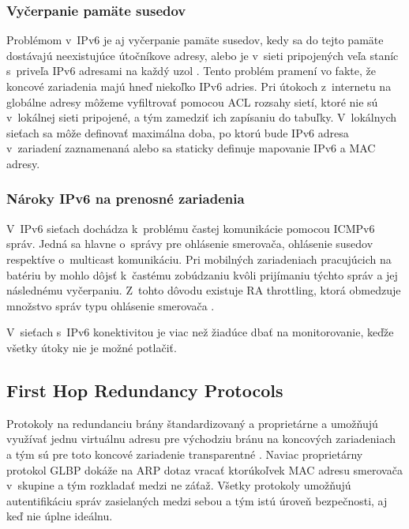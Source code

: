 \subsubsection{Vyčerpanie pamäte susedov}
Problémom v~IPv6 je aj vyčerpanie pamäte susedov, kedy sa do tejto pamäte dostávajú neexistujúce útočníkove adresy, alebo je v~sieti pripojených veľa staníc s~priveľa IPv6 adresami na každý uzol \cite{Podermanski1232015} \cite{Podermanski1932015}. Tento problém pramení vo fakte, že koncové zariadenia majú hneď niekoľko IPv6 adries. Pri útokoch z~internetu na globálne adresy môžeme vyfiltrovať pomocou ACL rozsahy sietí, ktoré nie sú v~lokálnej sieti pripojené, a tým zamedziť ich zapísaniu do tabuľky. V~lokálnych sieťach sa môže definovať maximálna doba, po ktorú bude IPv6 adresa v~zariadení zaznamenaná alebo sa staticky definuje mapovanie IPv6 a MAC adresy. 

\subsubsection{Nároky IPv6 na prenosné zariadenia}
V~IPv6 sieťach dochádza k~problému častej komunikácie pomocou ICMPv6 správ. Jedná sa hlavne o~správy pre ohlásenie smerovača, ohlásenie susedov respektíve o~multicast komunikáciu. Pri mobilných zariadeniach pracujúcich na batériu by mohlo dôjsť k~častému zobúdzaniu kvôli prijímaniu týchto správ a jej následnému vyčerpaniu. Z~tohto dôvodu existuje RA throttling, ktorá obmedzuje množstvo správ typu ohlásenie smerovača \cite{Podermanski532015}.


V~sieťach s~IPv6 konektivitou je viac než žiadúce dbať na monitorovanie, keďže všetky útoky nie je možné potlačiť. 



\subsection{First Hop Redundancy Protocols}
Protokoly na redundanciu brány štandardizovaný  a proprietárne  a  umožňujú využívať jednu virtuálnu adresu pre východziu bránu na koncových zariadeniach a tým sú pre toto koncové zariadenie transparentné \cite{Lammle2013}. Naviac proprietárny protokol GLBP dokáže na ARP dotaz vracať ktorúkoľvek MAC adresu smerovača v~skupine a tým rozkladať medzi ne záťaž. Všetky protokoly umožňujú autentifikáciu správ zasielaných medzi sebou a tým istú úroveň bezpečnosti, aj keď nie úplne ideálnu.  

